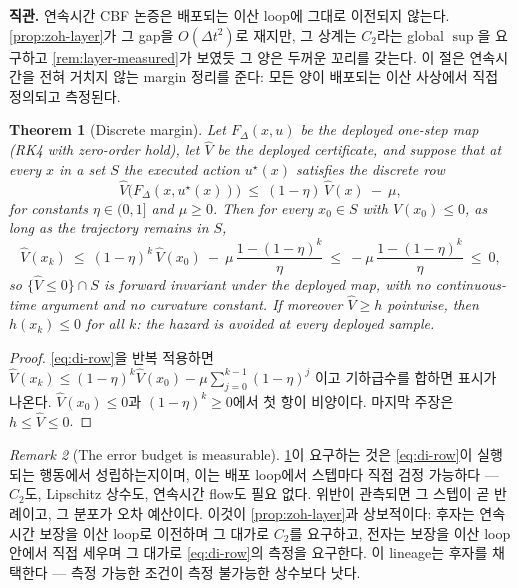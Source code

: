 \documentclass[11pt]{article}
\theoremstyle{plain}
\newtheorem{theorem}{Theorem}[section]
\theoremstyle{definition}
\theoremstyle{remark}
\newtheorem{remark}[theorem]{Remark}
\newcommand{\Vhat}{\widehat V}
\begin{document}
\textbf{직관.} 연속시간 CBF 논증은 배포되는 이산 loop에 그대로 이전되지 않는다.
\cref{prop:zoh-layer}가 그 gap을 $O(\Delta t^2)$로 재지만, 그 상계는 $C_2$라는 global
$\sup$을 요구하고 \cref{rem:layer-measured}가 보였듯 그 양은 두꺼운 꼬리를 갖는다. 이 절은
연속시간을 전혀 거치지 않는 margin 정리를 준다: 모든 양이 배포되는 이산 사상에서 직접 정의되고
측정된다.

\begin{theorem}[Discrete margin]\label{thm:di-margin}
Let $F_\Delta(x,u)$ be the deployed one-step map (RK4 with zero-order hold), let $\Vhat$ be the
deployed certificate, and suppose that at every $x$ in a set $S$ the executed action $u^\star(x)$
satisfies the discrete row
\begin{equation}\label{eq:di-row}
\Vhat\big(F_\Delta(x,u^\star(x))\big)\ \le\ (1-\eta)\,\Vhat(x)\ -\ \mu,
\end{equation}
for constants $\eta\in(0,1]$ and $\mu\ge0$. Then for every $x_0\in S$ with $\Vhat(x_0)\le0$, as
long as the trajectory remains in $S$,
\begin{equation}
\Vhat(x_k)\ \le\ (1-\eta)^k\,\Vhat(x_0)\ -\ \mu\,\frac{1-(1-\eta)^k}{\eta}\ \le\ -\mu\,\frac{1-(1-\eta)^k}{\eta}\ \le\ 0 ,
\end{equation}
so $\{\Vhat\le0\}\cap S$ is forward invariant under the deployed map, with no continuous-time
argument and no curvature constant. If moreover $\Vhat\ge h$ pointwise, then $h(x_k)\le0$ for all
$k$: the hazard is avoided at every deployed sample.
\end{theorem}
\begin{proof}
\cref{eq:di-row}을 반복 적용하면 $\Vhat(x_k)\le(1-\eta)^k\Vhat(x_0)-\mu\sum_{j=0}^{k-1}(1-\eta)^j$
이고 기하급수를 합하면 표시가 나온다. $\Vhat(x_0)\le0$과 $(1-\eta)^k\ge0$에서 첫 항이 비양이다.
마지막 주장은 $h\le\Vhat\le0$.
\end{proof}

\begin{remark}[The error budget is measurable]\label{rem:di-budget}
\cref{thm:di-margin}이 요구하는 것은 \cref{eq:di-row}이 실행되는 행동에서 성립하는지이며, 이는
배포 loop에서 스텝마다 직접 검정 가능하다 --- $C_2$도, Lipschitz 상수도, 연속시간 flow도 필요
없다. 위반이 관측되면 그 스텝이 곧 반례이고, 그 분포가 오차 예산이다. 이것이 \cref{prop:zoh-layer}과
상보적이다: 후자는 연속시간 보장을 이산 loop로 이전하며 그 대가로 $C_2$를 요구하고, 전자는
보장을 이산 loop 안에서 직접 세우며 그 대가로 \cref{eq:di-row}의 측정을 요구한다. 이 lineage는
후자를 채택한다 --- 측정 가능한 조건이 측정 불가능한 상수보다 낫다.
\end{remark}
\end{document}
